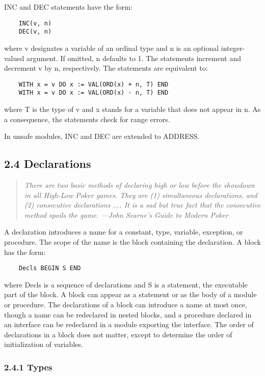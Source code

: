 \documentclass[10pt]{article}
\begin{document}
 INC and DEC statements have the form: 
\begin{verbatim}
    INC(v, n)
    DEC(v, n)
\end{verbatim}
 where v designates a variable of an ordinal type and n is an optional integer-valued argument. If omitted, n defaults to 1. The statements increment and decrement v by n, respectively. The statements are equivalent to: 
\begin{verbatim}
    WITH x = v DO x := VAL(ORD(x) + n, T) END
    WITH x = v DO x := VAL(ORD(x) - n, T) END
\end{verbatim}
 where T is the type of v and x stands for a variable that does not appear in n. As a consequence, the statements check for range errors. 


  In unsafe modules, INC and DEC are extended to ADDRESS. 


 
\subsection*{2.4 Declarations}


 
\begin{quote}
\emph{ There are two basic methods of declaring high or low before the showdown in all High-Low Poker games. They are (1) simultaneous declarations, and (2) consecutive declarations .... It is a sad but true fact that the consecutive method spoils the game. ---John Scarne's Guide to Modern Poker }
\end{quote}



 A declaration introduces a name for a constant, type, variable, exception, or procedure. The scope of the name is the block containing the declaration. A block has the form: 
\begin{verbatim}
    Decls BEGIN S END
\end{verbatim}
 where Decls is a sequence of declarations and S is a statement, the executable part of the block. A block can appear as a statement or as the body of a module or procedure. The declarations of a block can introduce a name at most once, though a name can be redeclared in nested blocks, and a procedure declared in an interface can be redeclared in a module exporting the interface. The order of declarations in a block does not matter, except to determine the order of initialization of variables. 


 
\subsubsection*{2.4.1 Types}
\end{document}
